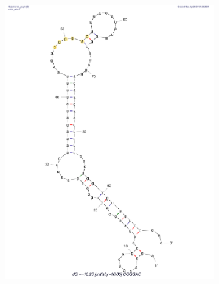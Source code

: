 \documentclass{scrartcl}[2013/05/29]%
\begin{document}
\begin{figure}[!ht]
\begin{subfigure}[b]{0.49\textwidth}
        \includegraphics[scale=0.25]{plots/Supplementary/Structure_CGGGAC.pdf}
        \label{fig:CGGGAC}
    \end{subfigure}
    \hfill
    \begin{subfigure}[b]{0.49\textwidth}
        \centering

\end{subfigure}
\end{figure}
\end{document}
